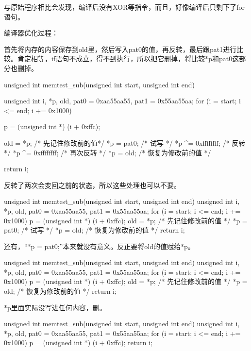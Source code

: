 与原始程序相比会发现，编译后没有XOR等指令，而且，好像编译后只剩下了for 语句。

\cs

编译器优化过程：

首先将内存的内容保存到old里，然后写入pat0的值，再反转，最后跟pat1进行比较。肯定相等，if语句不成立，得不到执行，所以把它删掉，将比较*p和pat0这部分也删掉。
\begin{code}
 unsigned int memtest_sub(unsigned int start, unsigned int end)
  {
      unsigned int i, *p, old, pat0 = 0xaa55aa55, pat1 = 0x55aa55aa;
      for (i = start; i <= end; i += 0x1000) {
          p = (unsigned int *) (i + 0xffc);

          old = *p;           /* 先记住修改前的值*/
          *p = pat0;          /* 试写 */
          *p ^= 0xffffffff;   /* 反转 */
          *p ^= 0xffffffff;   /* 再次反转 */
          *p = old;           /* 恢复为修改前的值 */
      }
      return i;
  }
\end{code}

反转了两次会变回之前的状态，所以这些处理也可以不要。
\begin{code}
unsigned int memtest_sub(unsigned int start, unsigned int end)
  {
      unsigned int i, *p, old, pat0 = 0xaa55aa55, pat1 = 0x55aa55aa;
      for (i = start; i <= end; i += 0x1000) {
          p = (unsigned int *) (i + 0xffc);
          old = *p;           /* 先记住修改前的值 */
          *p = pat0;          /* 试写 */
          *p = old;           /* 恢复为修改前的值 */
      }
      return i;
  }
\end{code}

还有，“*p = pat0;”本来就没有意义。反正要将old的值赋给*p。
\begin{code}
unsigned int memtest_sub(unsigned int start, unsigned int end)
  {
      unsigned int i, *p, old, pat0 = 0xaa55aa55, pat1 = 0x55aa55aa;
      for (i = start; i <= end; i += 0x1000) {
          p = (unsigned int *) (i + 0xffc);
          old = *p;           /* 先记住修改前的值 */
          *p = old;           /* 恢复为修改前的值 */
      }
      return i;
  }
\end{code}

*p里面实际没写进任何内容，删。
\begin{code}
unsigned int memtest_sub(unsigned int start, unsigned int end)
  {
      unsigned int i, *p, old, pat0 = 0xaa55aa55, pat1 = 0x55aa55aa;
      for (i = start; i <= end; i += 0x1000) {
          p = (unsigned int *) (i + 0xffc);
      }
      return i;
  }
\end{code}

